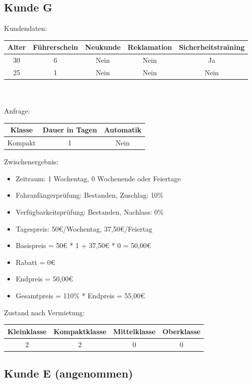 \subsection{Kunde G}

Kundendaten:\\
\begin{tabular}{|c|c|c|c|c|}
	\hline \textbf{Alter} & \textbf{Führerschein} & \textbf{Neukunde} & \textbf{Reklamation} & \textbf{Sicherheitstraining} \\ 
	\hline 30 & 6 & Nein & Nein & Ja \\ 
	\hline 25 & 1 & Nein & Nein & Nein \\ 
	\hline 
\end{tabular} 
\\\\
Anfrage:\\
\begin{tabular}{|c|c|c|}
	\hline \textbf{Klasse} & \textbf{Dauer in Tagen} & \textbf{Automatik} \\ 
	\hline Kompakt & 1 & Nein \\ 
	\hline 
\end{tabular}

Zwischenergebnis:
\begin{itemize}
	\item Zeitraum: 1 Wochentag, 0 Wochenende oder Feiertage
	\item Fahranfängerprüfung: Bestanden, Zuschlag: 10\%
	\item Verfügbarkeitsprüfung: Bestanden, Nachlass: 0\%
	\item Tagespreis: 50€/Wochentag, 37,50€/Feiertag
	\item Basispreis = 50€ * 1 + 37,50€ * 0 = 50,00€
	\item Rabatt = 0€
	\item Endpreis = 50,00€
	\item Gesamtpreis = 110\% * Endpreis = 55,00€
\end{itemize}

Zustand nach Vermietung:\\
\begin{tabular}{|c|c|c|c|}
	\hline \textbf{Kleinklasse} & \textbf{Kompaktklasse} & \textbf{Mittelklasse} & \textbf{Oberklasse}  \\ 
	\hline 2 & 2 & 0 & 0 \\ 
	\hline 
\end{tabular}

\subsection{Kunde E (angenommen)}

